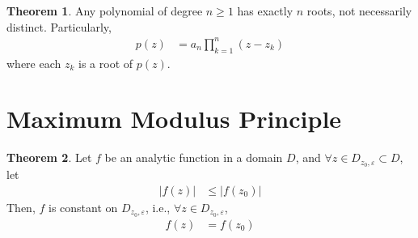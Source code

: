 \documentclass[titlepage, fleqn, a4paper, 12pt, twoside]{article}
\theoremstyle{definition}
\theoremstyle{theorem}
\newtheorem{theorem}{Theorem}
\begin{document}
\begin{theorem}
	Any polynomial of degree $n \ge 1$ has exactly $n$ roots, not necessarily distinct.
	Particularly,
	\begin{align*}
		p(z) & = a_n \prod\limits_{k = 1}^{n} (z - z_k)
	\end{align*}
	where each $z_k$ is a root of $p(z)$.
\end{theorem}

\section{Maximum Modulus Principle}

\begin{theorem}
	Let $f$ be an analytic function in a domain $D$, and $\forall z \in D_{z_0,\varepsilon} \subset D$, let
	\begin{align*}
		\left| f(z) \right| &\le \left| f(z_0) \right|
	\end{align*}
	Then, $f$ is constant on $D_{z_0,\varepsilon}$, i.e., $\forall z \in D_{z_0,\varepsilon}$,
	\begin{align*}
		f(z) & = f(z_0)
	\end{align*}
\end{theorem}
\end{document}
